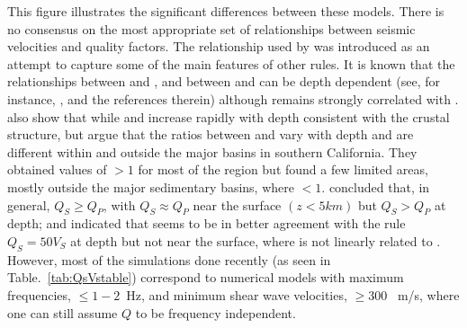 This figure illustrates the significant differences between these models. There is no consensus on the most appropriate set of relationships between seismic velocities and quality factors. The relationship used by \citet{Taborda_2013_BSSA} was introduced as an attempt to capture some of the main features of other \qsvs{} rules. It is known that the relationships between \qs{} and \vs{}, and between \qp{} and \qs{} can be depth dependent (see, for instance, \citet{Olsen_2003_BSSA}, and the references therein) although \qs{} remains strongly correlated with \vs{}.  \citet{Hauksson_2006_JGR} also show that while \qs{} and \qp{} increase rapidly with depth consistent with the crustal structure, but argue that the ratios between \qs{} and \qp{} vary with depth and are different within and outside the major basins in southern California. They obtained values of \qsoqp$>1$ for most of the region but found a few limited areas, mostly outside the major sedimentary basins, where \qsoqp$< 1$. \citet{Song_2013_AGU} concluded that, in general, $Q_{S} \geq Q_{P}$, with $Q_{S} \approx Q_{P}$ near the surface $(z < 5 km)$ but $Q_{S} > Q_{P}$ at depth; and indicated that \qs{} seems to be in better agreement with the rule $Q_{S} = 50V_{S}$ at depth but not near the surface, where \qs{} is not linearly related to \vs{}. However, most of the simulations done recently (as seen in Table.~\ref{tab:QsVstable}) correspond to numerical models with maximum frequencies, \fmax{} $\leq1-2$~Hz, and minimum shear wave velocities, \vsmin{}$\geq300$~ m/s, where one can still assume $Q$ to be frequency independent. 




